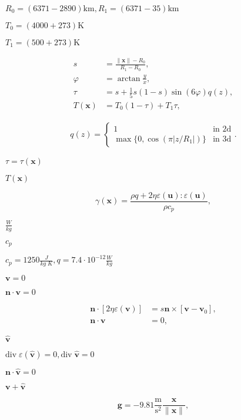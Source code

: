 \documentclass{article}
\begin{document}
$R_0=(6371-2890)\text{km}, R_1=(6371-35)\text{km}$
\pagebreak

$T_0=(4000+273)\text{K}$
\pagebreak

$T_1=(500+273)\text{K}$
\pagebreak

\begin{align*} s &= \frac{\|\mathbf x\|-R_0}{R_1-R_0}, \\ \varphi &= \arctan \frac{y}{x}, \\ \tau &= s + \frac 15 s(1-s) \sin(6\varphi) q(z), \\ T(\mathbf x) &= T_0(1-\tau) + T_1\tau, \end{align*}
\pagebreak

\begin{align*} q(z) = \left\{ \begin{array}{ll} 1 & \text{in 2d} \\ \max\{0, \cos(\pi |z/R_1|)\} & \text{in 3d} \end{array} \right. . \end{align*}
\pagebreak

$\tau=\tau(\mathbf x)$
\pagebreak

$T(\mathbf x)$
\pagebreak

\[ \gamma(\mathbf x) = \frac{\rho q+2\eta \varepsilon(\mathbf u):\varepsilon(\mathbf u)} {\rho c_p}, \]
\pagebreak

$\frac{W}{kg}$
\pagebreak

$c_p$
\pagebreak

$c_p=1250 \frac{J}{kg\; K}, q=7.4\cdot 10^{-12}\frac{W}{kg}$
\pagebreak

$\mathbf{v}=0$
\pagebreak

$\mathbf{n}\cdot\mathbf{v}=0$
\pagebreak

\begin{align*} \mathbf{n}\cdot [2\eta \varepsilon(\mathbf v)] &= s \mathbf{n} \times [\mathbf v - \mathbf v_0], \\ \mathbf{n} \cdot \mathbf v &= 0, \end{align*}
\pagebreak

$\hat{\mathbf v}$
\pagebreak

$\mathrm{div}\; \varepsilon(\hat{\mathbf v})=0, \mathrm{div} \;\hat{\mathbf v} = 0$
\pagebreak

$\mathbf{n} \cdot \hat{\mathbf v} = 0$
\pagebreak

$\mathbf v + \hat{\mathbf v}$
\pagebreak

\[ \mathbf g = -9.81 \frac{\text{m}}{\text{s}^2} \frac{\mathbf x}{\|\mathbf x\|}, \]
\pagebreak
\end{document}

